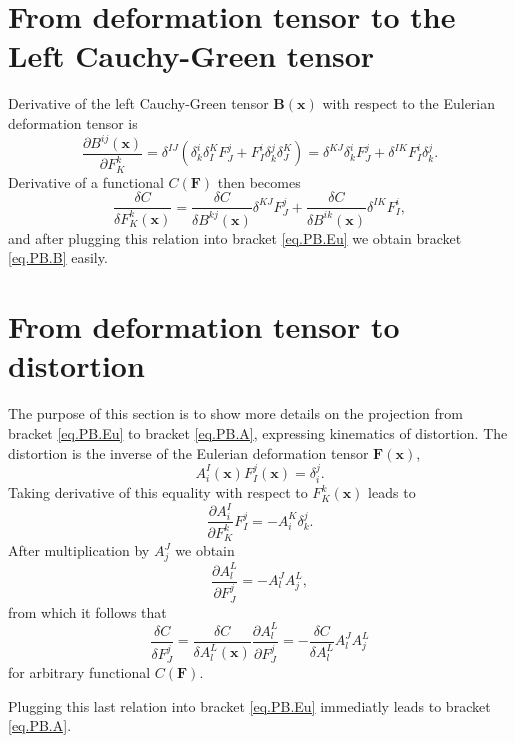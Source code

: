 \documentclass[
10pt, %
a4paper, %
oneside, %
headinclude,footinclude, %
BCOR5mm, %
]{scrartcl}
\newcommand{\xx}{\mathbf{x}}
\newcommand{\FF}{\mathbf{F}}
\newcommand{\BB}{\mathbf{B}}
\begin{document}
\section{From deformation tensor to the Left Cauchy-Green tensor}\label{sec.F-B}
Derivative of the left Cauchy-Green tensor $\BB(\xx)$ with respect to the Eulerian deformation tensor is
\begin{equation}
	\frac{\partial B^{ij}(\xx)}{\partial F^k_K} = \delta^{IJ}(\delta^i_k \delta^K_I F^j_J +  F^i_I \delta^j_k \delta^K_J)
	= \delta^{KJ}\delta^i_k F^j_J +  \delta^{IK} F^i_I \delta^j_k.
\end{equation}
Derivative of a functional $C(\FF)$ then becomes
\begin{equation}
	\frac{\delta C}{\delta F^k_K(\xx)} = 
	\frac{\delta C}{\delta B^{kj}(\xx)}\delta^{KJ} F^j_J +  \frac{\delta C}{\delta B^{ik}(\xx)}\delta^{IK} F^i_I,
\end{equation}
and after plugging this relation into bracket \eqref{eq.PB.Eu} we obtain bracket \eqref{eq.PB.B} easily.


\section{From deformation tensor to distortion}\label{sec.F-A}
The purpose of this section is to show more details on the projection from bracket \eqref{eq.PB.Eu} to bracket \eqref{eq.PB.A}, expressing kinematics of distortion. The distortion is the inverse of the Eulerian deformation tensor $\FF(\xx)$, 
\begin{equation}
	A^I_i(\xx) F^j_I(\xx) = \delta^j_i.
\end{equation}
Taking derivative of this equality with respect to $F^k_K(\xx)$ leads to
\begin{equation}
	\frac{\partial A^I_i}{\partial F^k_K} F^j_I = -A^K_i \delta^j_k.
\end{equation}
After multiplication by $A^J_j$ we obtain
\begin{equation}\label{app.eq.dAdF}
	\frac{\partial A^L_l}{\partial F^j_J} = -A^J_l A^L_j,
\end{equation}
from which it follows that 
\begin{equation}
	\frac{\delta C}{\delta F^j_J} = \frac{\delta C}{\delta A^L_l(\xx)} \frac{\partial A^L_l}{\partial F^j_J} = -\frac{\delta C}{\delta A^L_l} A^J_l A^L_j
\end{equation}
for arbitrary functional $C(\FF)$.

Plugging this last relation into bracket \eqref{eq.PB.Eu} immediatly leads to bracket \eqref{eq.PB.A}.
\end{document}
